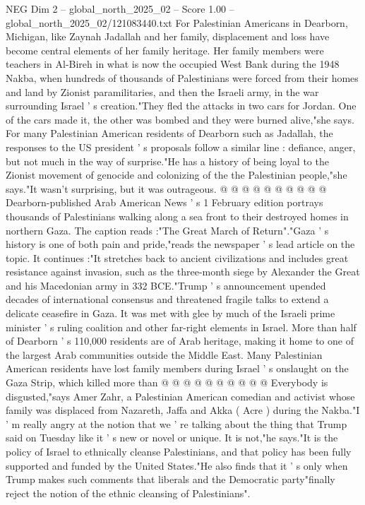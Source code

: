 \begin{textsample}{NEG Dim 2 – global\_north\_2025\_02 – Score 1.00 – global\_north\_2025\_02/121083440.txt}  \label{ex:f2_neg_009}
For Palestinian Americans in Dearborn, Michigan, like Zaynah Jadallah and her family, displacement and loss have become central elements of her family heritage.
Her family members were teachers in Al-Bireh in what is now the occupied West Bank during the 1948 Nakba, when hundreds of thousands of Palestinians were forced from their homes and land by Zionist paramilitaries, and then the Israeli army, in the war surrounding Israel ' s creation."They fled the attacks in two cars for Jordan.
One of the cars made it, the other was bombed and they were burned alive,"she says.
For many Palestinian American residents of Dearborn such as Jadallah, the responses to the US president ' s proposals follow a similar line : defiance, anger, but not much in the way of surprise."He has a history of being loyal to the Zionist movement of genocide and colonizing of the the Palestinian people,"she says."It wasn't surprising, but it was outrageous. @ @ @ @ @ @ @ @ @ @ Dearborn-published Arab American News ' s 1 February edition portrays thousands of Palestinians walking along a sea front to their destroyed homes in northern Gaza.
The caption reads :"The Great March of Return"."Gaza ' s history is one of both pain and pride,"reads the newspaper ' s lead article on the topic.
It continues :"It stretches back to ancient civilizations and includes great resistance against invasion, such as the three-month siege by Alexander the Great and his Macedonian army in 332 BCE."Trump ' s announcement upended decades of international consensus and threatened fragile talks to extend a delicate ceasefire in Gaza.
It was met with glee by much of the Israeli prime minister ' s ruling coalition and other far-right elements in Israel.
More than half of Dearborn ' s 110,000 residents are of Arab heritage, making it home to one of the largest Arab communities outside the Middle East.
Many Palestinian American residents have lost family members during Israel ' s onslaught on the Gaza Strip, which killed more than @ @ @ @ @ @ @ @ @ @ Everybody is disgusted,"says Amer Zahr, a Palestinian American comedian and activist whose family was displaced from Nazareth, Jaffa and Akka ( Acre ) during the Nakba."I ' m really angry at the notion that we ' re talking about the thing that Trump said on Tuesday like it ' s new or novel or unique.
It is not,"he says."It is the policy of Israel to ethnically cleanse Palestinians, and that policy has been fully supported and funded by the United States."He also finds that it ' s only when Trump makes such comments that liberals and the Democratic party"finally reject the notion of the ethnic cleansing of Palestinians".

\end{textsample}
